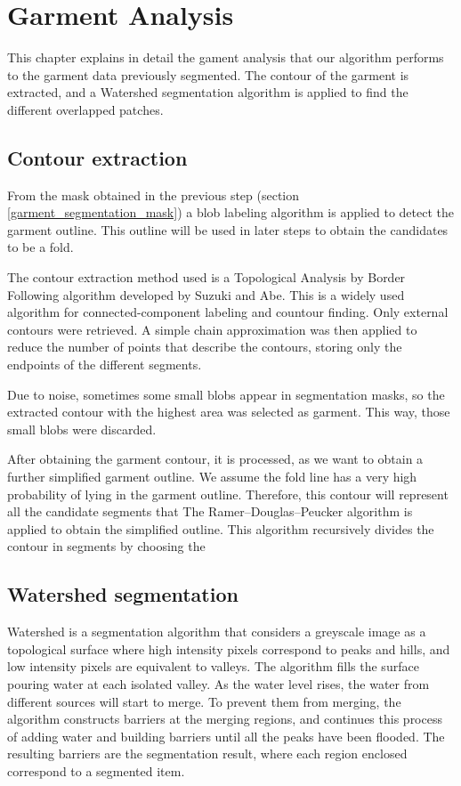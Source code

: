 \chapter{Garment Analysis}
\label{garment_analysis}

This chapter explains in detail the gament analysis that our algorithm performs to the garment data previously segmented. The contour of the garment is extracted, and a Watershed segmentation algorithm is applied to find the different overlapped patches.

\section{Contour extraction}
From the mask obtained in the previous step (section \ref{garment_segmentation_mask}) a blob labeling algorithm is applied to detect the garment outline. This outline will be used in later steps to obtain the candidates to be a fold.

The contour extraction method used is a Topological Analysis by Border Following algorithm developed by Suzuki and Abe. This is a widely used algorithm for connected-component labeling and countour finding. Only external contours were retrieved. A simple chain approximation was then applied to reduce the number of points that describe the contours, storing only the endpoints of the different segments.

Due to noise, sometimes some small blobs appear in segmentation masks, so the extracted contour with the highest area was selected as garment. This way, those small blobs were discarded.

After obtaining the garment contour, it is processed, as we want to obtain a further simplified garment outline. We assume the fold line has a very high probability of lying in the garment outline. Therefore, this contour will represent all the candidate segments that  The Ramer–Douglas–Peucker algorithm  is applied to obtain the simplified outline. This algorithm recursively divides the contour in segments by choosing the 

\section{Watershed segmentation}

Watershed is a segmentation algorithm that considers a greyscale image as a topological surface where high intensity pixels correspond to peaks and hills, and low intensity pixels are equivalent to valleys. The algorithm fills the surface pouring water at each isolated valley. As the water level rises, the water from different sources will start to merge. To prevent them from merging, the algorithm constructs barriers at the merging regions, and continues this process of adding water and building barriers until all the peaks have been flooded. The resulting barriers are the segmentation result, where each region enclosed correspond to a segmented item.

